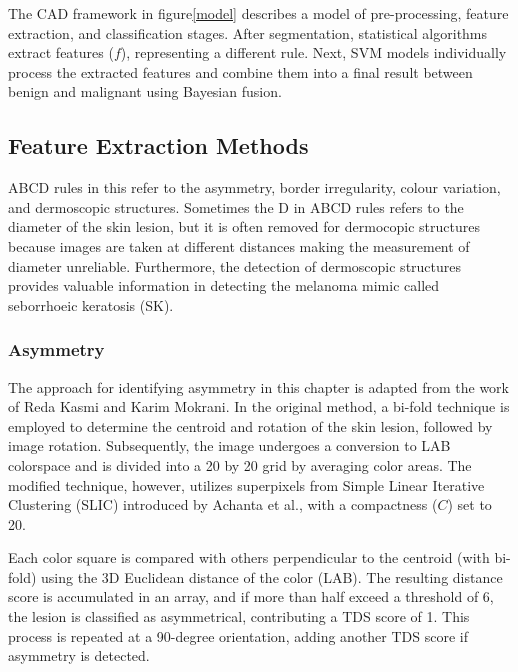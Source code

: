 The CAD framework in figure\ref{model} describes a model of pre-processing, feature extraction, and classification stages. After segmentation, statistical algorithms extract features ($f$), representing a different rule. Next, SVM models individually process the extracted features and combine them into a final result between benign and malignant using Bayesian fusion.





\subsection{Feature Extraction Methods}
ABCD rules in this refer to the asymmetry, border irregularity, colour variation, and dermoscopic structures. Sometimes the D in ABCD rules refers to the diameter of the skin lesion, but it is often removed for dermocopic structures because images are taken at different distances making the measurement of diameter unreliable. Furthermore, the detection of dermoscopic structures provides valuable information in detecting the melanoma mimic called seborrhoeic keratosis (SK)\cite{Minagawa2017}. 



\subsubsection{Asymmetry}
The approach for identifying asymmetry in this chapter is adapted from the work of Reda Kasmi and Karim Mokrani\cite{Kasmi2016}. In the original method, a bi-fold technique is employed to determine the centroid and rotation of the skin lesion, followed by image rotation. Subsequently, the image undergoes a conversion to LAB colorspace and is divided into a 20 by 20 grid by averaging color areas. The modified technique, however, utilizes superpixels from Simple Linear Iterative Clustering (SLIC) introduced by Achanta et al.\cite{Achanta2012}, with a compactness ($C$) set to 20.

Each color square is compared with others perpendicular to the centroid (with bi-fold) using the 3D Euclidean distance of the color (LAB). The resulting distance score is accumulated in an array, and if more than half exceed a threshold of 6, the lesion is classified as asymmetrical, contributing a TDS score of 1. This process is repeated at a 90-degree orientation, adding another TDS score if asymmetry is detected.

